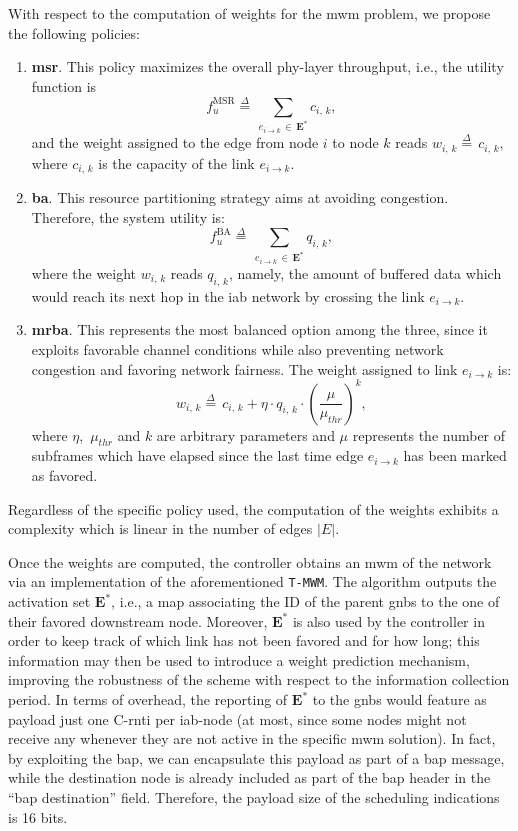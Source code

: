 With respect to the computation of weights for the \gls{mwm} problem, we propose the following policies:

\begin{enumerate}
\item \textbf{\gls{msr}}. 
This policy maximizes the overall \gls{phy}-layer throughput, i.e., the utility function is 
\[ f_u^{\mathrm{MSR}} \mathop = \limits^{\Delta} \, \sum_{e_{i \to k} \, \in \, \mathbf{E^*}} c_{i, \, k}, \]
 and the weight assigned to the edge from node $i$ to node $k$ reads $w_{i, \, k} \mathop = \limits^{\Delta} \, c_{i, \, k}$, where $c_{i, \, k}$ is the capacity of the link $e_{i \to k}$.
\item \textbf{\gls{ba}}.
This resource partitioning strategy aims at avoiding congestion. Therefore, the system utility is:
\[ f_u^{\mathrm{BA}} \mathop = \limits^{\Delta} \, \sum_{e_{i \to k} \, \in \, \mathbf{E^*}} q_{i, \, k}, \]
where the weight $w_{i, \, k}$ reads $q_{i, \, k}$, namely, the amount of buffered data which would reach its next hop in the \gls{iab} network by crossing the link $e_{i \to k}$.
\item \textbf{\gls{mrba}}. 
This represents the most balanced option among the three, since it exploits favorable channel conditions while also preventing network congestion and favoring network fairness. The weight assigned to link $e_{i \to k}$ is:
\[ w_{i, \, k} \mathop = \limits^{\Delta} \, c_{i, \, k} + \eta \cdot q_{i, \, k} \cdot \left( \frac{\mu}{\mu_{thr}} \right)^{k}, \]
where $\eta$, $\, \mu_{thr}$ and $k$ are arbitrary parameters and $\mu$ represents the number of subframes which have elapsed since the last time edge $e_{i \to k}$ has been marked as favored.
\end{enumerate}
Regardless of the specific policy used, the computation of the weights exhibits a complexity which is linear in the number of edges $\vert E \vert$.

Once the weights are computed, the controller obtains an \gls{mwm} of the network via an implementation of the aforementioned \texttt{T-MWM}. The algorithm outputs the activation set $\mathbf{E^*}$, i.e., a map associating the ID of the parent \glspl{gnb} to the one of their favored downstream node. Moreover, $\mathbf{E^*}$ is also used by the controller in order to keep track of which link has not been favored and for how long; this information may then be used to introduce a weight prediction mechanism, improving the robustness of the scheme with respect to the information collection period. 
In terms of overhead, the reporting of $\mathbf{E^*}$ to the \glspl{gnb} would feature as payload just one C-\gls{rnti} per \gls{iab}-node (at most, since some nodes might not receive any whenever they are not active in the specific \gls{mwm} solution). In fact, by exploiting the \gls{bap}, we can encapsulate this payload as part of a \gls{bap} message, while the destination node is already included as part of the \gls{bap} header in the ``\gls{bap} destination'' field. Therefore, the payload size of the scheduling indications is 16 bits. 

